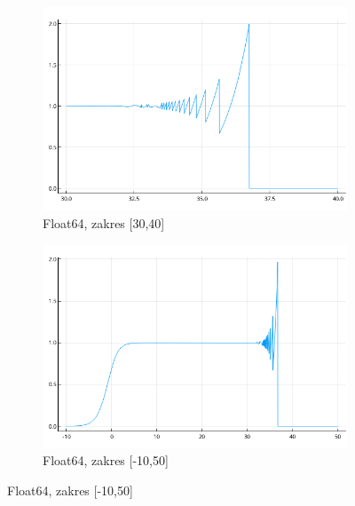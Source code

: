 \documentclass{article}
\begin{document}
\begin{figure}[ht]
	\begin{subfigure}{.5\textwidth}
		\centering
		\includegraphics[width=.8\linewidth]{JuliaPlots/Float64(30-40)}  
		\caption*{Float64, zakres [30,40]}

	\end{subfigure}
	\begin{subfigure}{.5\textwidth}
		\centering
		\includegraphics[width=.8\linewidth]{JuliaPlots/Float64(-10-50)}  
		\caption*{Float64, zakres [-10,50]}

	\end{subfigure}
\end{figure}
\end{document}
